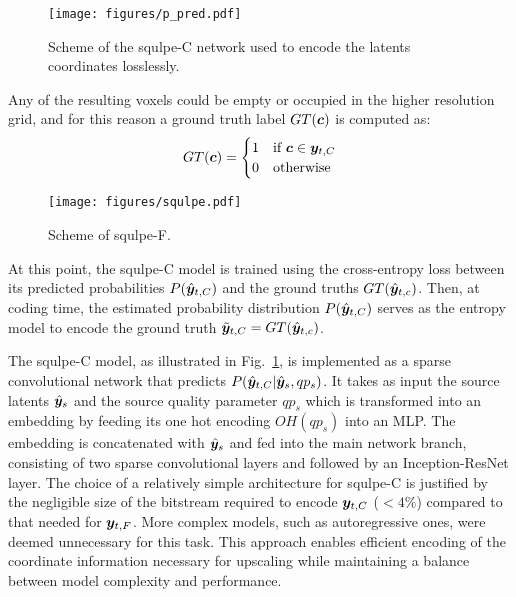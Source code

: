 \begin{figure}[t]
    \centering
    \texttt{[image: figures/p\_pred.pdf]}
    \caption{Scheme of the \gls{squlpe}-C network used to encode the latents coordinates losslessly.}
    \label{fig:p_predictor}
\end{figure}

Any of the resulting voxels could be empty or occupied in the higher resolution grid, and for this reason 
a ground truth label $GT(\C)$ is computed as: 
\begin{equation}
GT(\boldsymbol{c})
 =
\begin{cases}
    1 & \text{if } \C \in \y_{t, C} \\
    0 & \text{otherwise}
\end{cases}
\end{equation}


\begin{figure*}
    \centering
    \texttt{[image: figures/squlpe.pdf]}
    \caption{Scheme of \gls{squlpe}-F.}
    \label{fig:srqulpe}
\end{figure*}

At this point, the \gls{squlpe}-C model is trained using the cross-entropy loss between its predicted probabilities $P(\hat{\y}_{t, C})$ and the ground truths $GT(\hat{\y}_{t, c})$.
Then, at coding time, the estimated probability distribution $P(\hat{\y}_{t, C})$ serves as the entropy model to encode the ground truth $\tilde{\y}_{t, C} = GT(\hat{\y}_{t, c})$.

The \gls{squlpe}-C model, as illustrated in Fig.~\ref{fig:p_predictor}, is implemented as a sparse convolutional network that predicts $P(\hat{\y}_{t, C}|\hat{\y}_s, qp_s)$. It takes as input the source latents $\hat{\y}_s$ and the source quality parameter $qp_s$ which is transformed into an embedding by feeding its one hot encoding  
$OH(qp_s)$ into an MLP. The embedding is concatenated with $\hat{\y}_s$ and fed into the main network branch, consisting of two sparse convolutional layers and followed by an Inception-ResNet layer. The choice of a relatively simple architecture for \gls{squlpe}-C is justified by the negligible size of the bitstream required to encode $\y_{t, C}$ ($< 4\%$) compared to that needed for $\y_{t, F}$. More complex models, such as autoregressive ones, were deemed unnecessary for this task. This approach enables efficient encoding of the coordinate information necessary for upscaling while maintaining a balance between model complexity and performance.


